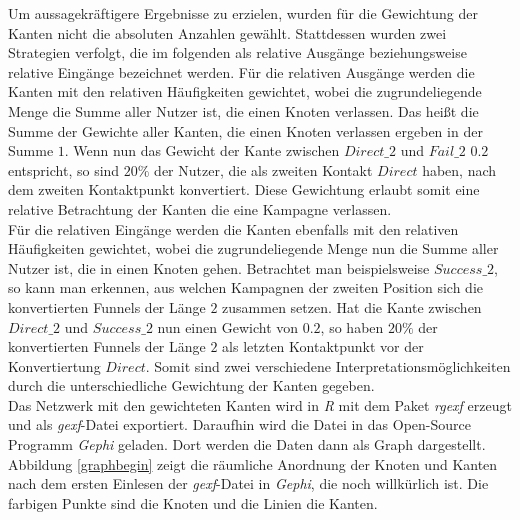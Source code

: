 Um aussagekräftigere Ergebnisse zu erzielen, wurden für die Gewichtung der Kanten nicht die absoluten Anzahlen gewählt. Stattdessen wurden zwei Strategien verfolgt, die im folgenden als relative Ausgänge beziehungsweise relative Eingänge bezeichnet werden. Für die relativen Ausgänge werden die Kanten mit den relativen Häufigkeiten gewichtet, wobei die zugrundeliegende Menge die Summe aller Nutzer ist, die einen Knoten verlassen. Das heißt die Summe der Gewichte aller Kanten, die einen Knoten verlassen ergeben in der Summe $1$. Wenn nun das Gewicht der Kante zwischen $Direct\_2$ und $Fail\_2$ $0.2$ entspricht, so sind $20 \%$ der Nutzer, die als zweiten Kontakt $Direct$ haben, nach dem zweiten Kontaktpunkt konvertiert. Diese Gewichtung erlaubt somit eine relative Betrachtung der Kanten die eine Kampagne verlassen.\\
Für die relativen Eingänge werden die Kanten ebenfalls mit den relativen Häufigkeiten gewichtet, wobei die zugrundeliegende Menge nun die Summe aller Nutzer ist, die in einen Knoten gehen. Betrachtet man beispielsweise $Success\_2$, so kann man erkennen, aus welchen Kampagnen der zweiten Position sich die konvertierten Funnels der Länge $2$ zusammen setzen. Hat die Kante zwischen $Direct\_2$ und $Success\_2$ nun einen Gewicht von $0.2$, so haben $20 \%$ der konvertierten Funnels der Länge $2$ als letzten Kontaktpunkt vor der Konvertiertung $Direct$. Somit sind zwei verschiedene Interpretationsmöglichkeiten durch die unterschiedliche Gewichtung der Kanten gegeben.\\
Das Netzwerk mit den gewichteten Kanten wird in \textit{R} mit dem Paket \textit{rgexf} \cite{rgexf} erzeugt und als \textit{gexf}-Datei exportiert. Daraufhin wird die Datei in das Open-Source Programm \textit{Gephi} \cite{gephi_bastian} geladen. Dort werden die Daten dann als Graph dargestellt. Abbildung \ref{graphbegin} zeigt die räumliche Anordnung der Knoten und Kanten nach dem ersten Einlesen der \textit{gexf}-Datei in \textit{Gephi}, die noch willkürlich ist. Die farbigen Punkte sind die Knoten und die Linien die Kanten.

